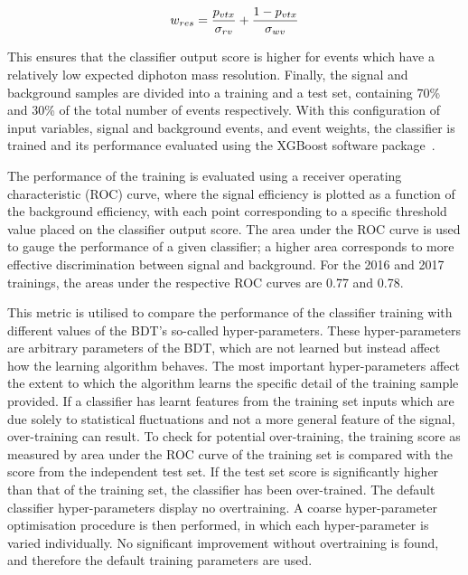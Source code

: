 \begin{equation}
  w_{res} = \frac{p_{vtx}}{\sigma_{rv}} + \frac{1-p_{vtx}}{\sigma_{wv}}
\end{equation}

This ensures that the classifier output score is higher for events 
which have a relatively low expected diphoton mass resolution.
Finally, the signal and background samples are divided into a training and a test set,
containing 70\% and 30\% of the total number of events respectively.
With this configuration of input variables, signal and background events, and event weights, 
the classifier is trained and its performance evaluated using the XGBoost software package~\cite{XGBoost}.

The performance of the training is evaluated using a receiver operating characteristic (ROC) curve, 
where the signal efficiency is plotted as a function of the background efficiency,
with each point corresponding to a specific threshold value placed on the classifier output score.
The area under the ROC curve is used to gauge the performance of a given classifier; 
a higher area corresponds to more effective discrimination between signal and background.
For the 2016 and 2017 trainings, the areas under the respective ROC curves are 0.77 and 0.78.

This metric is utilised to compare the performance of the classifier training 
with different values of the BDT's so-called hyper-parameters.
These hyper-parameters are arbitrary parameters of the BDT, 
which are not learned but instead affect how the learning algorithm behaves.
The most important hyper-parameters affect the extent to which 
the algorithm learns the specific detail of the training sample provided.
If a classifier has learnt features from the training set inputs
which are due solely to statistical fluctuations and not a more general feature of the signal, 
over-training can result.
To check for potential over-training, the training score as measured by area under the ROC curve 
of the training set is compared with the score from the independent test set.
If the test set score is significantly higher than that of the training set, 
the classifier has been over-trained.
The default classifier hyper-parameters display no overtraining.
A coarse hyper-parameter optimisation procedure is then performed, 
in which each hyper-parameter is varied individually.
No significant improvement without overtraining is found, 
and therefore the default training parameters are used.


